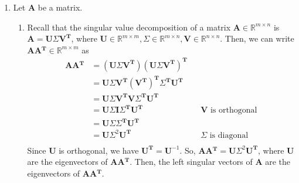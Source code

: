 \documentclass [12pt] {article}
\newcommand{\R}{\mathbb{R}}
\newcommand{\T}{\bf{T}}
\renewcommand{\bf}[1]{\textbf{{#1}}}
\begin{document}
\begin{enumerate}
\begin{enumerate}
            \item
                \newcommand{\A}{\bf{A}}
                \newcommand{\U}{\bf{U}}
                \newcommand{\V}{\bf{V}}
                \newcommand{\AT}{\bf{A$^{\T}$}}
                Let $\A$ be a matrix.
                \begin{enumerate}
                    \item Recall that the singular value decomposition of a matrix 
                        $\A \in \R^{m \times n}$ is $\A = \U \Sigma \V^{\T}$, where 
                        $\U \in \R^{m \times m}, \Sigma \in \R^{m \times n}, \V \in \R^{n \times n}$. 
                        Then, we can write $\A \AT \in \R^{m \times m}$ as
                        \begin{align*}
                            \A \AT &= \left( \U \Sigma \V^{\T} \right) \left( \U \Sigma \V^{\T} \right)^{\T} \\
                                   &= \U \Sigma \V^{\T} \left( \V^{\T} \right)^{\T} \Sigma^{\T} \U^{\T} \\
                                   &= \U \Sigma \V^{\T} \V \Sigma^{\T} \U^{\T} \\
                                   &= \U \Sigma \bf{I} \Sigma^{\T} \U^{\T} && \V \text{ is orthogonal} \\
                                   &= \U \Sigma \Sigma^{\T} \U^{\T} \\
                                   &= \U \Sigma^2 \U^{\T} && \Sigma \text{ is diagonal} \\
                        \end{align*}
                        Since $\U$ is orthogonal, we have $\U^{\T} = \U^{-1}$. So,
                        $\A \AT = \U \Sigma^2 \U^{\T}$, where $\U$ are the eigenvectors of 
                        \A \AT. Then, the left singular vectors of $\A$ are the eigenvectors of 
                        \A \AT. \vspace{10pt}


\end{enumerate}
\end{enumerate}
\end{enumerate}
\end{document}
